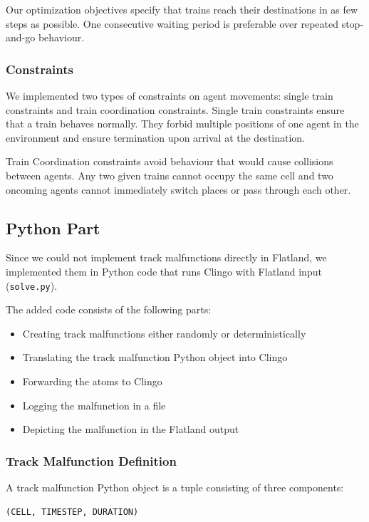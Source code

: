 \documentclass[runningheads]{llncs}
\begin{document}
Our optimization objectives specify that trains reach their destinations in as few steps as possible. One consecutive waiting period is preferable over repeated stop-and-go behaviour.

\subsubsection{Constraints}
We implemented two types of constraints on agent movements: single train constraints and train coordination constraints. Single train constraints ensure that a train behaves normally. They forbid multiple positions of one agent in the environment and ensure termination upon arrival at the destination.

Train Coordination constraints avoid behaviour that would cause collisions between agents. Any two given trains cannot occupy the same cell and two oncoming agents cannot immediately switch places or pass through each other.



\subsection{Python Part}\label{solve}

Since we could not implement track malfunctions directly in Flatland, we implemented them in Python code that runs Clingo with Flatland input (\verb|solve.py|).

The added code consists of the following parts:

\begin{itemize}
    \item Creating track malfunctions either randomly or deterministically
    \item Translating the track malfunction Python object into Clingo
    \item Forwarding the atoms to Clingo
    \item Logging the malfunction in a file
    \item Depicting the malfunction in the Flatland output
\end{itemize}

\subsubsection{Track Malfunction Definition}

A track malfunction Python object is a tuple consisting of three components:

\begin{verbatim}
(CELL, TIMESTEP, DURATION)
\end{verbatim}
\end{document}
